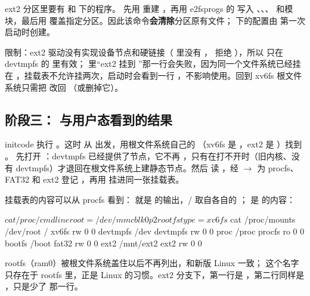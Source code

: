ext2 分区里要有  和  下的程序。 先用  重建 ，再用 e2fsprogs 的  写入 、、、 和模块，最后用  覆盖指定分区。因此该命令\textbf{会清除}分区原有文件； 下的配置由  第一次启动时创建。

限制：ext2 驱动没有实现设备节点和硬链接（ 里没有 ， 拒绝 ），所以  只在 devtmpfs 的  里有效； 里“ext2 挂到 ”那一行会失败，因为同一个文件系统已经挂在 \code{/}，挂载表不允许挂两次，启动时会看到一行 ，不影响使用。回到 xv6fs 根文件系统只需把  改回 （或删掉它）。

\subsection{阶段三： 与用户态看到的结果}
\label{sec:ns-stage3}

initcode 执行 。这时  从  出发，用根文件系统自己的 （xv6fs 是 ，ext2 是 ）找到 。 先打开 ：devtmpfs 已经提供了节点，它不再 ，只有在打不开时（旧内核、没有 devtmpfs）才退回在根文件系统上建静态节点。然后  读 ，经  $\to$  为 procfs、FAT32 和 ext2 登记 ，再用  挂进同一张挂载表。

挂载表的内容可以从 procfs 看到： 就是  的输出，/ 取自各自的 ； 是  的内容：

\begin{txtcode}
$ cat /proc/cmdline
root=/dev/mmcblk0p2 rootfstype=xv6fs
$ cat /proc/mounts
/dev/root / xv6fs rw 0 0
devtmpfs /dev devtmpfs rw 0 0
proc /proc procfs ro 0 0
bootfs /boot fat32 rw 0 0
ext2 /mnt/ext2 ext2 rw 0 0
\end{txtcode}

rootfs（ram0）被根文件系统盖住以后不再列出，和新版 Linux 一致； 这个名字只存在于 rootfs 里，正是 Linux 的习惯。ext2 分支下，第一行是 ，第二行同样是 ，只是少了  那一行。

